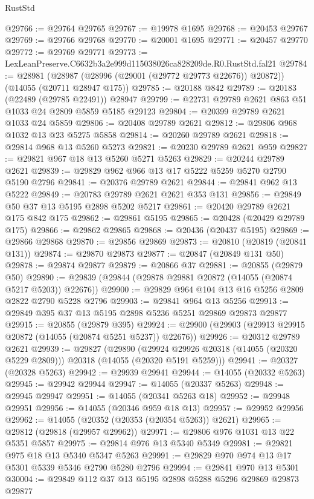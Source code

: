 \begin{lexlean}{RustStd}
\begin{coremodule}
@29766 := @29764 @29765
@29767 := @19978 @1695
@29768 := @20453 @29767
@29769 := @29766 @29768
@29770 := @20001 @1695
@29771 := @20457 @29770
@29772 := @29769 @29771
@29773 := LexLeanPreserve.C6632b3a2e999d115038026ca828209de.R0.RustStd.fal21
@29784 := @28981
    (@28987 (@28996 (@29001 (@29772 @29773 @22676)) @20872))
    (@14055 (@20711 @28947 @175))
@29785 := @20188 @842
@29789 := @20183 (@22489 (@29785 @22491)) @28947
@29799 := @22731 @29789 @2621 @863 @51 @1033 @24 @2809 @5859 @5185 @29123
@29804 := @20399 @29789 @2621 @1033 @24 @5859
@29806 := @20408 @29789 @2621
@29812 := @29806 @968 @1032 @13 @23 @5275 @5858
@29814 := @20260 @29789 @2621
@29818 := @29814 @968 @13 @5260 @5273
@29821 := @20230 @29789 @2621 @959
@29827 := @29821 @967 @18 @13 @5260 @5271 @5263
@29829 := @20244 @29789 @2621
@29839 := @29829 @962 @966 @13 @17 @5222 @5259 @5270 @2790 @5190 @2796
@29841 := @20376 @29789 @2621
@29844 := @29841 @962 @13 @5222
@29849 := @20783 @29789 @2621 @2621 @353 @131
@29856 := @29849 @50 @37 @13 @5195 @2898 @5202 @5217
@29861 := @20420 @29789 @2621 @175 @842 @175
@29862 := @29861 @5195
@29865 := @20428 (@20429 @29789 @175)
@29866 := @29862 @29865
@29868 := @20436 (@20437 @5195)
@29869 := @29866 @29868
@29870 := @29856 @29869
@29873 := @20810 (@20819 (@20841 @131))
@29874 := @29870 @29873
@29877 := @20847 (@20849 @131 @50)
@29878 := @29874 @29877
@29879 := @20866 @37
@29881 := @20855 (@29879 @50)
@29890 := @29839 (@29844 (@29878 @29881 @20872 (@14055 (@20874 @5217 @5203)) @22676))
@29900 := @29829 @964 @104 @13 @16 @5256 @2809 @2822 @2790 @5228 @2796
@29903 := @29841 @964 @13 @5256
@29913 := @29849 @395 @37 @13 @5195 @2898 @5236 @5251 @29869 @29873 @29877
@29915 := @20855 (@29879 @395)
@29924 := @29900 (@29903 (@29913 @29915 @20872 (@14055 (@20874 @5251 @5237)) @22676))
@29926 := @20312 @29789 @2621
@29939 := @29827
    (@29890
      (@29924 @29926 @20318 (@14055 (@20320 @5229 @2809)))
      @20318
      (@14055 (@20320 @5191 @5259)))
@29941 := @20327 (@20328 @5263)
@29942 := @29939 @29941
@29944 := @14055 (@20332 @5263)
@29945 := @29942 @29944
@29947 := @14055 (@20337 @5263)
@29948 := @29945 @29947
@29951 := @14055 (@20341 @5263 @18)
@29952 := @29948 @29951
@29956 := @14055 (@20346 @959 @18 @13)
@29957 := @29952 @29956
@29962 := @14055 (@20352 (@20353 (@20354 @5263)) @2621)
@29965 := @29812 (@29818 (@29957 @29962))
@29971 := @29806 @976 @1031 @13 @22 @5351 @5857
@29975 := @29814 @976 @13 @5340 @5349
@29981 := @29821 @975 @18 @13 @5340 @5347 @5263
@29991 := @29829 @970 @974 @13 @17 @5301 @5339 @5346 @2790 @5280 @2796
@29994 := @29841 @970 @13 @5301
@30004 := @29849 @112 @37 @13 @5195 @2898 @5288 @5296 @29869 @29873 @29877

\end{coremodule}
\end{lexlean}
